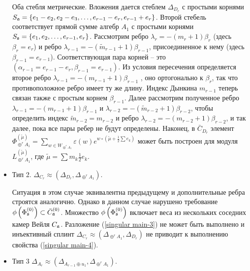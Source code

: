 \begin{itemize}
Оба стебля метрические. Вложения дается стеблем $\Delta_{D_{r}}$ с простыми корнями $S_{\mathfrak{a}}=\left\{e_{1}-e_{2},e_{2}-e_{3},\ldots,e_{r-1}-e_{r},e_{r-1}+e_{r}\right\} $. Второй стебель соответствует прямой сумме алгебр $A_{1}$ с простыми корнями $S_{\mathfrak{s}}=\left\{ e_{1},e_{2},\ldots ,e_{r-1},e_{r}\right\} $. Рассмотрим ребро $\lambda _{r}=-\left( m_{r}+1\right) \beta _{r}$ (здесь $\beta_{r}=e_{r}$) и ребро $\lambda _{r-1}=-\left(\widetilde{m}_{r-1}+1\right) \beta _{r-1}$, присоединенное к нему (здесь $\beta_{r-1}=e_{r-1}$). Соответствующая пара корней -- это $\left( \alpha _{r-1}=e_{r-1}-e_{r},\beta _{r-1}=e_{r-1}\right) $. Из условия пересечения определяется второе ребро $\lambda_{r-1}=-\left( m_{r-1}+1\right) \beta _{r-1}$ , оно ортогонально к  $\beta _{r}$, так что противоположное ребро имеет ту же длину. Индекс Дынкина $m_{r-1}$ теперь связан также с простым корнем $\beta _{r-1}$. Далее рассмотрим полученное ребро $\lambda _{r-1}=-\left( m_{r-1}+1\right) \beta _{r-1}$ и $\lambda_{r-2}=-\left( \widetilde{m}_{r-2}+1\right) \beta _{r-2}$, чтобы определить индекс $\widetilde{m}_{r-2}=m_{r-2}$ и ребро $\lambda _{r-2}=-\left( m_{r-2}+1\right) \beta _{r-2}$, и так далее, пока все пары ребер не будут определены. Наконец, в $\bar{C}_{D_{r}}$ элемент $\Phi _{\oplus ^{r}A_{1}}^{\left(\widetilde{\mu }\right) }=\sum_{w\in W_{\oplus^{r}A_{1}}}\varepsilon \left( w\right) e^{w\circ \left( \widetilde{\mu }+\frac{1}{2}\sum e_{k}\right) }$ может быть построен для модуля
$L_{\oplus ^{r}A_{1}}^{\left( \widetilde{\mu }\right) }$, где
$\widetilde{\mu }=\sum m_{k}\frac{1}{2}e_{k}$.

\item
Тип 2. $\Delta _{C_{r}}\approx (\Delta _{D_{r}},\Delta _{\oplus^{r}A_{1}}). $

Ситуация в этом случае эквивалентна предыдущему и дополнительные ребра строятся аналогично. Однако в данном случае нарушено требование $\phi\left(\Phi^{(0)}_{\mathfrak{s}}\right)\subset {\bar C_{\mathfrak{a}}}^{(0)}$. Множество $\phi\left(\Phi^{(0)}_{\mathfrak{s}}\right)$ включает веса из нескольких соседних камер Вейля $C_{\mathfrak{a}}$. Разложение (\ref{singular main-3}) не может быть выполнено и инъективный сплинт $\Delta_{C_r}\approx (\Delta_{\oplus^r A_1}, \Delta_{D_r})$ не приводит к выполнению свойства (\ref{singular main-4}).

\item
Тип 3 $\Delta _{A_{r}}\approx (\Delta _{A_{r-1}\oplus u_{1}},\Delta _{\oplus ^{r}A_{1}}).$


\end{itemize}
